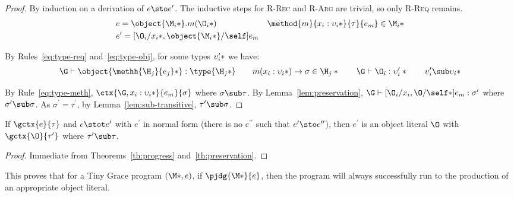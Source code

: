 \begin{theorem}[Preservation]
  \begin{proof}
    By induction on a derivation of $e \sto e^\prime$.  The inductive steps for
    \textsc{R-Rec} and \textsc{R-Arg} are trivial, so only \textsc{R-Req}
    remains.
%
    \begin{align*}
      &e = \object{\*\M_i*}.m(\*\O_i*) &
      \method{m}{\*x_i : \upsilon_i*}{\tau}{e_m} \in \*\M_i* \\
      &e^\prime = [\*\O_i/x_i*, \object{\*\M_i*}/\self]e_m &
    \end{align*}

    \noindent By Rules~\ref{eq:type-req} and~\ref{eq:type-obj}, for some types
    $\*\upsilon^\prime_i*$ we have:
%
    \begin{displaymath}
      \G \vdash \object{\*\methh{\H_j}{e_j}*} : \type{\*\H_j*} \quad\quad
      m(\*x_i : \upsilon_i*) \to \sigma \in \*\H_j* \quad\quad
      \G \vdash \*\O_i : \upsilon^\prime_i* \quad\quad
      \*\upsilon^\prime_i \sub \upsilon_i*
    \end{displaymath}

    \noindent By Rule~\ref{eq:type-meth}, $\ctx{\G,\*x_i :
    \upsilon_i*}{e_m}{\sigma}$ where $\sigma \sub \tau$. By
    Lemma~\ref{lem:preservation}, $\G \vdash [\*\O_i/x_i,\O/\self*]e_m :
    \sigma^\prime$ where $\sigma^\prime \sub \sigma$.  As $\sigma^\prime =
    \tau^\prime$, by Lemma~\ref{lem:sub-transitive}, $\tau^\prime \sub \sigma$.
  \end{proof}

\end{theorem}

\begin{theorem}\label{th:type-soundness}
  If $\gctx{e}{\tau}$ and $e \stot e^\prime$ with $e^\prime$ in normal form
  (there is no $e^{\prime\prime}$ such that $e^\prime \sto e^{\prime\prime}$),
  then $e^\prime$ is an object literal $\O$ with $\gctx{\O}{\tau^\prime}$ where
  $\tau^\prime \sub \tau$.

  \begin{proof}
    Immediate from Theorems~\ref{th:progress} and~\ref{th:preservation}.
  \end{proof}
\end{theorem}

\noindent This proves that for a Tiny Grace program $(\*\M*, e)$, if
$\pjdg{\*\M*}{e}$, then the program will always successfully run to the
production of an appropriate object literal.


